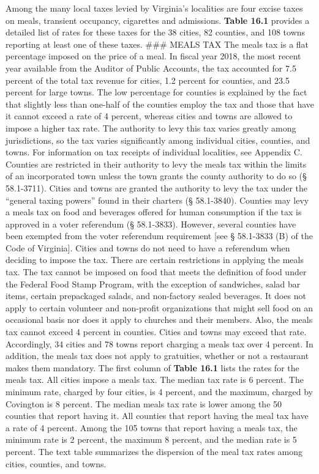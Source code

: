 \documentclass[
]{book}
\begin{document}
Among the many local taxes levied by Virginia's localities are four excise taxes on meals, transient occupancy, cigarettes and admissions. \textbf{Table 16.1} provides a detailed list of rates for these taxes for the 38 cities, 82 counties, and 108 towns reporting at least one of these taxes.
\textbar{}
\#\#\# MEALS TAX
\textbar{} The meals tax is a flat percentage imposed on the price of a meal. In fiscal year 2018, the most recent year available from the Auditor of Public Accounts, the tax accounted for 7.5 percent of the total tax revenue for cities, 1.2 percent for counties, and 23.5 percent for large towns. The low percentage for counties is explained by the fact that slightly less than one-half of the counties employ the tax and those that have it cannot exceed a rate of 4 percent, whereas cities and towns are allowed to impose a higher tax rate. The authority to levy this tax varies greatly among jurisdictions, so the tax varies significantly among individual cities, counties, and towns. For information on tax receipts of individual localities, see Appendix C.
\textbar{}
\textbar{} Counties are restricted in their authority to levy the meals tax within the limits of an incorporated town unless the town grants the county authority to do so (§ 58.1-3711). Cities and towns are granted the authority to levy the tax under the ``general taxing powers'' found in their charters (§ 58.1-3840).
\textbar{}
\textbar{} Counties may levy a meals tax on food and beverages offered for human consumption if the tax is approved in a voter referendum (§ 58.1-3833). However, several counties have been exempted from the voter referendum requirement {[}see § 58.1-3833 (B) of the Code of Virginia{]}. Cities and towns do not need to have a referendum when deciding to impose the tax.
\textbar{}
\textbar{} There are certain restrictions in applying the meals tax. The tax cannot be imposed on food that meets the definition of food under the Federal Food Stamp Program, with the exception of sandwiches, salad bar items, certain prepackaged salads, and non-factory sealed beverages. It does not apply to certain volunteer and non-profit organizations that might sell food on an occasional basis nor does it apply to churches and their members. Also, the meals tax cannot exceed 4 percent in counties. Cities and towns may exceed that rate. Accordingly, 34 cities and 78 towns report charging a meals tax over 4 percent. In addition, the meals tax does not apply to gratuities, whether or not a restaurant makes them mandatory.
\textbar{}
\textbar{} The first column of \textbf{Table 16.1} lists the rates for the meals tax. All cities impose a meals tax. The median tax rate is 6 percent. The minimum rate, charged by four cities, is 4 percent, and the maximum, charged by Covington is 8 percent. The median meals tax rate is lower among the 50 counties that report having it. All counties that report having the meal tax have a rate of 4 percent. Among the 105 towns that report having a meals tax, the minimum rate is 2 percent, the maximum 8 percent, and the median rate is 5 percent.
\textbar{}
\textbar{} The text table summarizes the dispersion of the meal tax rates among cities, counties, and towns.
\end{document}
